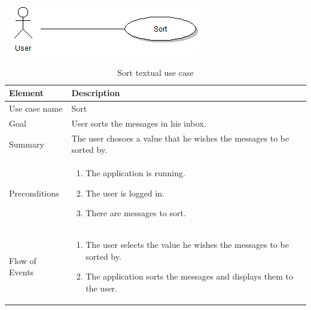 \begin{table}
\begin{center}
\begin{center}
\includegraphics[width=\textwidth]{sort}
\end{center}
\begin{tabular}{p{3cm}|p{12cm}} \hline
\textbf{Element} & \textbf{Description} \\ \hline \hline
Use case name & Sort \\
Goal & User sorts the messages in his inbox. \\
Summary & The user chosoes a value that he wishes the messages to be sorted by. \\
Preconditions &
\begin{enumerate}
\item{}The application is running.
\item{}The user is logged in.
\item{}There are messages to sort.
\end{enumerate} \\ \hline
Flow of Events &
\begin{enumerate}
\item{}The user selects the value he wishes the messages to be sorted by.
\item{}The application sorts the messages and displays them to the user.
\end{enumerate} \\ \hline
\end{tabular}
\end{center}
\caption{Sort textual use case} \label{tab:search}
\end{table}


